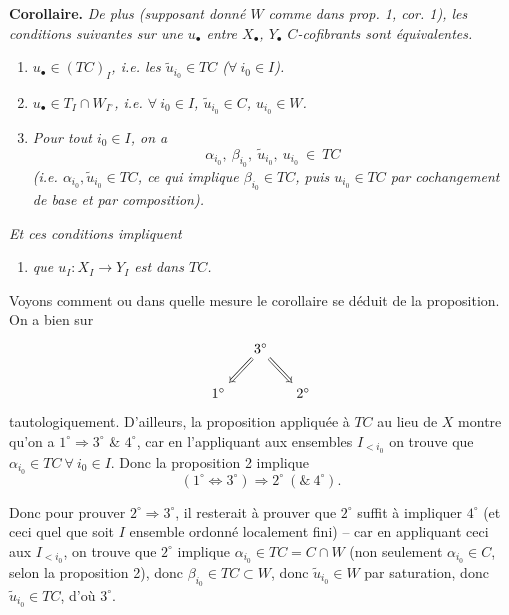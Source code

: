 \documentclass[11pt]{article}
\newcommand{\printedpage}[1]{\marginpar{\footnotesize p.~#1\ifstrequal{#1}{1}{\\[2pt]{[page 1]}}{}}}
\newcommand{\msp}[1]{\ifstrequal{#1}{page 1}{}{\marginpar{\footnotesize [#1]}}}
\begin{document}
\textbf{Corollaire.} \textit{De plus (supposant donné $W$ comme dans prop. 1, cor. 1), les conditions suivantes sur une $u_{\bullet}$ entre $X_{\bullet}$, $Y_{\bullet}$ $C$-cofibrants sont équivalentes.}
\begin{enumerate}
\item[$1^{\circ}$)] \textit{$u_{\bullet} \in (TC)_I$, i.e. les $\tilde{u}_{i_0} \in TC$ ($\forall\ i_0 \in I$).}
\item[$2^{\circ}$)] \textit{$u_{\bullet} \in T_I \cap W_{I^{\circ}}$, i.e. $\forall\ i_0 \in I$, $\tilde{u}_{i_0} \in C$, $u_{i_0} \in W$.} %
\item[$3^{\circ}$)] \textit{Pour tout $i_0 \in I$, on a}
\[
\alpha_{i_0},\ \beta_{i_0},\ \tilde{u}_{i_0},\ u_{i_0} \ \in \ TC
\]
\textit{(i.e. $\alpha_{i_0}, \tilde{u}_{i_0} \in TC$, ce qui implique $\beta_{i_0} \in TC$, puis $u_{i_0} \in TC$ par cochangement de base et par composition).}
\end{enumerate}
\textit{Et ces conditions impliquent}
\begin{enumerate}
\item[$4^{\circ}$)] \textit{que $u_I : X_I \longrightarrow Y_I$ est dans $TC$.}
\end{enumerate}

Voyons comment ou dans quelle mesure le corollaire se déduit de la proposition. On a bien sur %
\printedpage{5}
\[
\begin{tikzcd}[column sep=small]
& 3^{\circ} \arrow[dl, Rightarrow] \arrow[dr, Rightarrow] & \\
1^{\circ} & & 2^{\circ}
\end{tikzcd}
\]
tautologiquement. D'ailleurs, la proposition appliquée à $TC$ au lieu de $X$ montre qu'on a $1^{\circ} \Longrightarrow 3^{\circ}$ \& $4^{\circ}$, car en l'appliquant aux ensembles $I_{<i_0}$ on trouve que $\alpha_{i_0} \in TC\ \forall\ i_0 \in I$. Donc la proposition 2 implique %
\[
(1^{\circ} \Longleftrightarrow 3^{\circ}) \Longrightarrow 2^{\circ}\ (\&\ 4^{\circ}).
\]

\msp{page 9}

Donc pour prouver $2^{\circ} \Longrightarrow 3^{\circ}$, il resterait à prouver que $2^{\circ}$ suffit à impliquer $4^{\circ}$ (et ceci quel que soit $I$ ensemble ordonné localement fini) -- car en appliquant ceci aux $I_{<i_0}$, on trouve que $2^{\circ}$ implique $\alpha_{i_0} \in TC = C \cap W$ (non seulement $\alpha_{i_0} \in C$, selon la proposition 2), donc $\beta_{i_0} \in TC \subset W$, donc $\tilde{u}_{i_0} \in W$ par saturation, donc $\tilde{u}_{i_0} \in TC$, d'où $3^{\circ}$.
\end{document}
